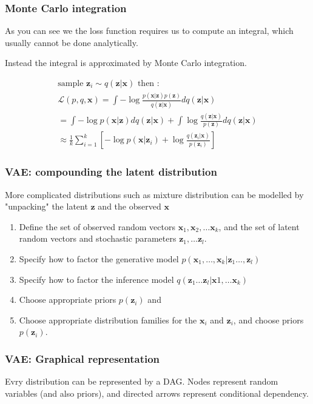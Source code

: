 \documentclass[final]{beamer}
\theoremstyle{plain}
\theoremstyle{definition}
\theoremstyle{remark}
\newcommand{\x}{\mathbf{x}}
\newcommand{\z}{\mathbf{z}}
\newcommand{\LL}{\mathcal{L}}
\begin{document}
\begin{frame}
\frametitle{Monte Carlo integration}
As you can see we the loss function requires us to compute an integral, which
usually cannot be done analytically.

Instead the integral is approximated by Monte Carlo integration.

{\small
\begin{equation}
\begin{aligned}
\text{sample  } \z_i \sim q(\z | \x) \text{   then :}\\
\LL(p,q,\x) = 
\int - \log \frac{p(\x|\z)p(\z)}{q(\z|\x)}dq(\z|\x) \\
= \int -\log p(\x|\z)dq(\z|\x) + 
\int \log \frac{q(\z|\x)}{p(\z)}dq(\z|\x) \\
\approx \frac{1}{k} \sum_{i=1}^k [-\log p(\x|\z_i)
+ \log \frac{q(\z_i|\x)}{p(\z_i)} ]
\label{eq:elbomc}
\end{aligned}
\end{equation}
}

\end{frame}
\begin{frame}
\frametitle{VAE: compounding the latent distribution}
More complicated distributions such as mixture distribution
can be modelled by "unpacking" the latent $\z$ and the observed $\x$
\label{VAE-specs}
\begin{enumerate}
\item{} Define the set of observed random vectors $\x_1, \x_2, \dots \x_k$, and 
the set of latent random vectors and stochastic parameters $\z_1, \dots \z_l$.
\item{} Specify how to factor the generative model $p(\x_1,\dots, \x_k| \z_1
\dots , \z_l)$
\item{} Specify how to factor the inference model $q(\z_1 \dots \z_l | \x1,
\dots \x_k)$
\item{} Choose appropriate priors $p(\z_i)$ and
\item{} Choose appropriate distribution families for the $\x_i$ and $\z_i$,
and choose priors $p(\z_i)$.
\end{enumerate}

\end{frame}

\begin{frame}
\frametitle{VAE: Graphical representation}
Evry distribution can be represented by a DAG. Nodes represent random variables
(and also priors), and directed arrows represent conditional dependency.

\end{frame}
\end{document}
